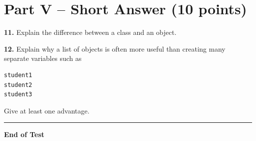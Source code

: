 \documentclass[11pt]{article}
\begin{document}
\vspace{2in}

\newpage

\section*{Part V -- Short Answer (10 points)}

\textbf{11.} Explain the difference between a class and an object.

\vspace{2.5in}

\textbf{12.} Explain why a list of objects is often more useful than creating many separate variables such as

\begin{verbatim}
student1
student2
student3
\end{verbatim}

Give at least one advantage.

\vspace{2.5in}

\hrule

\vspace{0.2cm}

\begin{center}
\textbf{End of Test}
\end{center}
\end{document}
